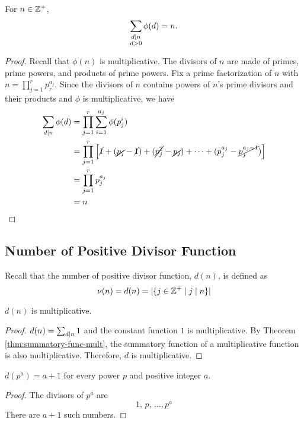 \begin{theorem}[Gauss]
    For $n \in \mathbb{Z}^+$,
    $$
    \sum_{\substack{d \mathrel{\mid} n \\ d > 0}} \phi(d) = n.
    $$
\end{theorem}
\begin{proof}
    Recall that $\phi(n)$ is multiplicative. The divisors of $n$ are made of primes, prime powers, and products of prime powers. Fix a prime factorization of $n$ with $n = \prod_{j=1}^r p_r^{a_j}$. Since the divisors of $n$ contains powers of $n$'s prime divisors and their products and $\phi$ is multiplicative, we have
    $$
    \begin{aligned}
        \sum_{d \mathrel{\mid} n} \phi(d) &= \prod_{j=1}^r \sum_{i=1}^{a_j} \phi(p_j^i) \\
        &= \prod_{j=1}^r \left[ \cancel{1} + (\cancel{p_j} - \cancel{1}) + (\cancel{p_j^2} - \cancel{p_j}) + \cdots + (p_j^{a_j} - \cancel{p_j^{a_j - 1}}) \right]  \\
        &= \prod_{j=1}^r p_j^{a_j} \\
        &= n
    \end{aligned}
    $$
\end{proof}

\subsection{Number of Positive Divisor Function}

Recall that the number of positive divisor function, $d(n)$, is defined as
$$
\nu(n) = d(n) = |\{j \in \mathbb{Z}^+ \mid j \mathrel{\mid} n\}|
$$

\begin{theorem}
    $d(n)$ is multiplicative.
\end{theorem}

\begin{proof}
    $d(n) = \sum_{d \mathrel{\mid} n} 1$ and the constant function $1$ is multiplicative. By Theorem \ref{thm:summatory-func-mult}, the summatory function of a multiplicative function is also multiplicative. Therefore, $d$ is multiplicative.
\end{proof}

\begin{theorem}
    $d(p^a) = a + 1$ for every power $p$ and positive integer $a$.
\end{theorem}
\begin{proof}
    The divisors of $p^a$ are
    $$
    1,\, p,\, \ldots, p^a
    $$
    There are $a+1$ such numbers.
\end{proof}

